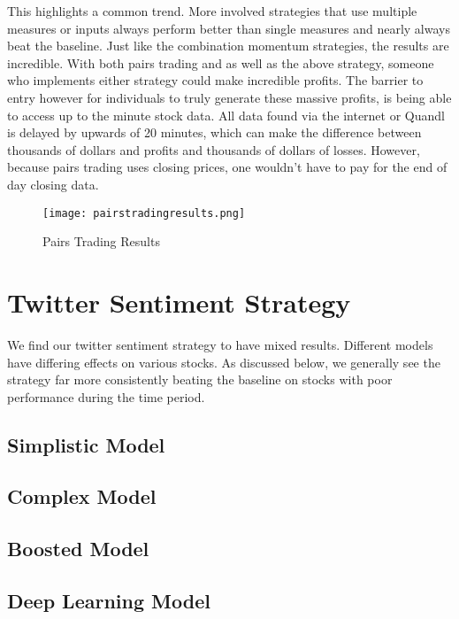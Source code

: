 \documentclass[../thesis.tex]{subfiles}
\begin{document}
This highlights a common trend. More involved strategies that use multiple measures or inputs always perform better than single measures and nearly always beat the baseline. Just like the combination momentum strategies, the results are incredible. With both pairs trading and as well as the above strategy, someone who implements either strategy could make incredible profits. The barrier to entry however for individuals to truly generate these massive profits, is being able to access up to the minute stock data. All data found via the internet or Quandl is delayed by upwards of 20 minutes, which can make the difference between thousands of dollars and profits and thousands of dollars of losses. However, because pairs trading uses closing prices, one wouldn't have to pay for the end of day closing data.

\begin{figure}[h]
\centering
\texttt{[image: pairstradingresults.png]}
\caption{Pairs Trading Results \label{overflow}}
\label{PAIRSRESULTSfigure}
\end{figure}

\section{Twitter Sentiment Strategy}

We find our twitter sentiment strategy to have mixed results. Different models have differing effects on various stocks. As discussed below, we generally see the strategy far more consistently beating the baseline on stocks with poor performance during the time period.

\subsection{Simplistic Model}
\subsection{Complex Model}
\subsection{Boosted Model}
\subsection{Deep Learning Model}
\end{document}
